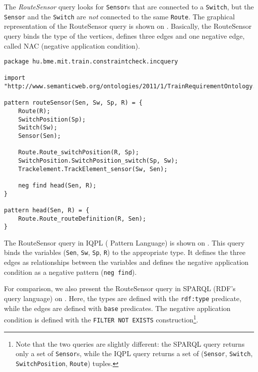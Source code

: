 The \textit{RouteSensor} query looks for \texttt{Sensor}s that are connected to a \texttt{Switch}, but the \texttt{Sensor} and the \texttt{Switch} are \emph{not} connected to the same \texttt{Route}. The graphical representation of the RouteSensor query is shown on . Basically, the RouteSensor query binds the type of the vertices, defines three edges and one negative edge, called NAC (negative application condition). 


\lstset{language=viatra}

\begin{lstlisting}[caption=The RouteSensor query in IQPL, label=lst:routesensor-iqpl]
package hu.bme.mit.train.constraintcheck.incquery

import "http://www.semanticweb.org/ontologies/2011/1/TrainRequirementOntology.owl" 

pattern routeSensor(Sen, Sw, Sp, R) = {
	Route(R);
	SwitchPosition(Sp);
	Switch(Sw);
	Sensor(Sen);
	
	Route.Route_switchPosition(R, Sp);
	SwitchPosition.SwitchPosition_switch(Sp, Sw);
	Trackelement.TrackElement_sensor(Sw, Sen);
	
	neg find head(Sen, R);	
}

pattern head(Sen, R) = {
	Route.Route_routeDefinition(R, Sen);
}
\end{lstlisting}

The RouteSensor query in IQPL (\iq{} Pattern Language) %
is shown on . This query binds the variables (\texttt{Sen}, \texttt{Sw}, \texttt{Sp}, \texttt{R}) to the appropriate type. It defines the three edges as relationships between the variables and defines the negative application condition as a negative pattern (\texttt{neg find}).

For comparison, we also present the RouteSensor query in SPARQL (RDF's query language) on . Here, the types are defined with the \texttt{rdf:type} predicate, while the edges are defined with \texttt{base} predicates. The negative application condition is defined with the \texttt{FILTER NOT EXISTS} construction\footnote{Note that the two queries are slightly different: the SPARQL query returns only a set of \texttt{Sensor}s, while the IQPL query returns a set of (\texttt{Sensor}, \texttt{Switch}, \texttt{SwitchPosition}, \texttt{Route}) tuples.}.


